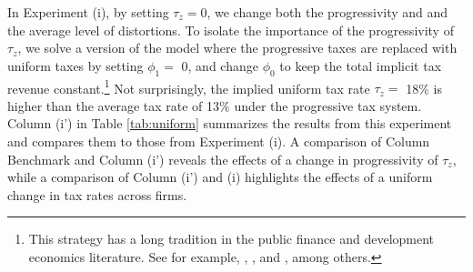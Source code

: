 \documentclass[AEJ]{AEA}
\begin{document}
In Experiment (i), by setting $\tau_z = 0$, we change both the progressivity and and the average level of distortions. To isolate the importance of the progressivity of $\tau_z$, we solve a version of the model where the progressive taxes are replaced with uniform taxes by setting $\phi_1 =$ 0, and change $\phi_0$ to keep the total implicit tax revenue constant.\footnote{This strategy has a long tradition in the public finance and development economics literature. See for example, \citet{Ventura:1999}, \citet{ConesaKrueger:2006}, \citet{Bhattacharyaetal:2013} and \citet{BentoRestuccia:2016}, among others.} Not surprisingly, the implied uniform tax rate $\tau_z =$ 18\% is higher than the average tax rate of 13\% under the progressive tax system. Column (i') in Table \ref{tab:uniform} summarizes the results from this experiment and compares them to those from Experiment (i). A comparison of Column Benchmark and Column (i') reveals the effects of a change in progressivity of $\tau_z$, while a comparison of Column (i') and (i) highlights the effects of a uniform change in tax rates across firms.
\end{document}
